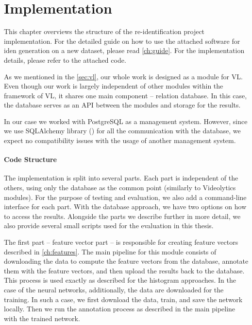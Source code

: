 \chapter{Implementation}

This chapter overviews the structure of the re-identification project implementation. For the detailed guide on how to use the attached software for \gls{iden} generation on a new dataset, please read \autoref{ch:guide}. For the implementation details, please refer to the attached code.

As we mentioned in the \autoref{sec:vl}, our whole work is designed as a module for \gls{VL}. Even though our work is largely independent of other modules within the framework of \gls{VL}, it shares one main component -- relation database. In this case, the database serves as an API between the modules and storage for the results.

In our case we worked with PostgreSQL as a management system. However, since we use SQLAlchemy library (\cite{sqlalchemy}) for all the communication with the database, we expect no compatibility issues with the usage of another management system.

\subsubsection*{Code Structure}
The implementation is split into several parts. Each part is independent of the others, using only the database as the common point (similarly to Videolytics modules). For the purpose of testing and evaluation, we also add a command-line interface for each part. With the database approach, we have two options on how to access the results. 
Alongside the parts we describe further in more detail,  we also provide several small scripts used for the evaluation in this thesis.

The first part -- feature vector part -- is responsible for creating feature vectors described in \autoref{ch:features}. The main pipeline for this module consists of downloading the data to compute the feature vectors from the database, annotate them with the feature vectors, and then upload the results back to the database. This process is used exactly as described for the histogram approaches. In the case of the neural networks, additionally, the data are downloaded for the training. In such a case, we first download the data, train, and save the network locally. Then we run the annotation process as described in the main pipeline with the trained network.

